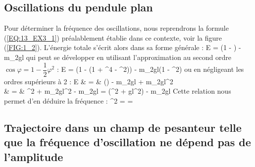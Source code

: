 \subsection{Oscillations du pendule plan}

Pour d\'eterminer la fr\'equence des oscillations, nous reprendrons la formule (\ref{EQ:13_EX3_1}) pr\'ealablement \'etablie dans ce contexte, voir la figure (\ref{FIG:1_2}). L'\'energie totale s'\'ecrit alors dans sa forme g\'en\'erale :
\benn
	E = \left(1 - \right) - m_{2}gl\cos\varphi
\eenn
qui peut se d\'evelopper en utilisant l'approximation au second ordre $\cos\varphi = 1 - \dfrac{1}{2}\varphi^{2}$ :
\benn
	E = \left(1 - (1 + \varphi^{4} - \varphi^{2})\right) - m_{2}gl(1 - \varphi^{2})
\eenn
ou en n\'egligeant les ordres sup\'erieurs \`a 2 :
\bea
	E & = & \left(\right) - m_{2}gl + m_{2}gl\varphi^{2} \nonumber \\
	& = & \dot{\varphi}^{2} + m_{2}gl\varphi^{2} - m_{2}gl = \left(\dot{\varphi}^{2} + gl\varphi^{2}\right) - m_{2}gl \nonumber
\eea
Cette relation nous permet d'en d\'eduire la fr\'equence :
\benn
	\omega^{2} =  = 
\eenn

\subsection{Trajectoire dans un champ de pesanteur telle que la fr\'equence d'oscillation ne d\'epend pas de l'amplitude}

